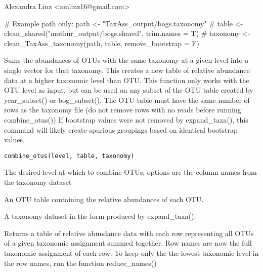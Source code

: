 \documentclass[a4paper]{book}
\begin{document}
%
\begin{Author}\relax
Alexandra Linz <amlinz16@gmail.com>
\end{Author}
%
\begin{Examples}
\begin{ExampleCode}

# Example path only: path <- "TaxAss_output/bogs.taxonomy"
# table <- clean_shared("mothur_output/bogs.shared", trim.names = T)
# taxonomy <- clean_TaxAss_taxonomy(path, table, remove_bootstrap = F)

\end{ExampleCode}
\end{Examples}
%
\begin{Description}\relax
Sums the abundances of OTUs with the same taxonomy at a given level into a single vector for that taxonomy. This creates a new table of relative abundance data at a higher taxonomic level than OTU. This function only works with the OTU level as input, but can be used on any subset of the OTU table created by year\_subset() or bog\_subset(). The OTU table must have the same number of rows as the taxonomy file (do not remove rows with no reads before running combine\_otus())
If bootstrap values were not removed by expand\_taxa(), this command will likely create spurious groupings based on identical bootstrap values.
\end{Description}
%
\begin{Usage}
\begin{verbatim}
combine_otus(level, table, taxonomy)
\end{verbatim}
\end{Usage}
%
\begin{Arguments}
\begin{ldescription}
\item[\code{level}] 
The desired level at which to combine OTUs; options are the column names from the taxonomy dataset

\item[\code{table}] 
An OTU table containing the relative abundances of each OTU.

\item[\code{taxonomy}] 
A taxonomy dataset in the form produced by expand\_taxa().

\end{ldescription}
\end{Arguments}
%
\begin{Value}
Returns a table of relative abundance data with each row representing all OTUs of a given taxonomic assignment summed together. Row names are now the full taxonomic assignment of each row. To keep only the the lowest taxonomic level in the row names, run the function reduce\_names()
\end{Value}
\end{document}
